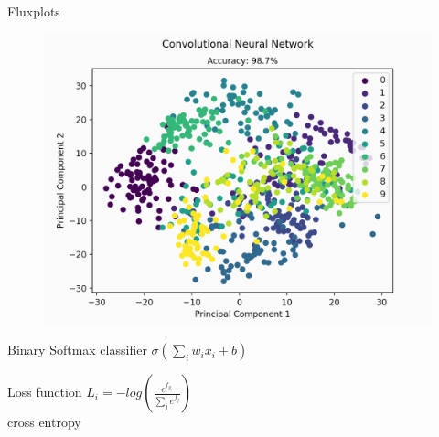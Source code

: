 \begin{frame}{Flux}{plots}
	\begin{minipage}{0.56\textwidth}
		\begin{figure}
			\includegraphics[width=\textwidth]{Imagenes/plot.png}
		\end{figure}
	\end{minipage}
	\hfill
	\begin{minipage}{0.38\textwidth}
		\begin{block}{Binary Softmax classifier}
			\centering
			$\sigma(\sum_i w_ix_i + b)$
		\end{block}
		\begin{exampleblock}{Loss function}
			\centering\vspace*{0.1cm}
			$L_i = -log(\frac{e^{f_{y_i}}}{\sum_j e^{f_j}})$\\[0.1cm]
			cross entropy
		\end{exampleblock}
	\end{minipage}
\end{frame}
